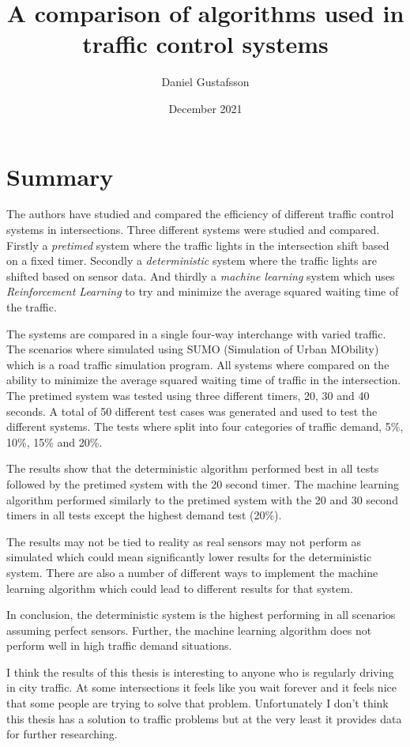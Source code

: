 \documentclass[10pt, a4paper]{article}
\title{A comparison of algorithms used in traffic control systems}
\author{Daniel Gustafsson}
\date{December 2021}
\begin{document}
\maketitle

\section{Summary}
The authors have studied and compared the efficiency of different traffic control systems in intersections.
Three different systems were studied and compared. Firstly a \textit{pretimed} system where the traffic lights
in the intersection shift based on a fixed timer. Secondly a \textit{deterministic} system where the traffic lights
are shifted based on sensor data. And thirdly a \textit{machine learning} system which uses \textit{Reinforcement Learning}
to try and minimize the average squared waiting time of the traffic.

The systems are compared in a single four-way interchange with varied traffic. The scenarios where simulated using SUMO
(Simulation of Urban MObility) which is a road traffic simulation program. All systems where compared on the ability to
minimize the average squared waiting time of traffic in the intersection. The pretimed system was tested using three different
timers, 20, 30 and 40 seconds. A total of 50 different test cases was generated and used to test the different systems.
The tests where split into four categories of traffic demand, 5\%, 10\%, 15\% and 20\%.

The results show that the deterministic algorithm performed best in all tests followed by the pretimed system with the 20 second
timer. The machine learning algorithm performed similarly to the pretimed system with the 20 and 30 second timers in all tests
except the highest demand test (20\%).

The results may not be tied to reality as real sensors may not perform as simulated which could mean significantly lower results
for the deterministic system. There are also a number of different ways to implement the machine learning algorithm which could
lead to different results for that system.

In conclusion, the deterministic system is the highest performing in all scenarios assuming perfect sensors. Further, the
machine learning algorithm does not perform well in high traffic demand situations. 

I think the results of this thesis is interesting to anyone who is regularly driving in city traffic. At some intersections it feels
like you wait forever and it feels nice that some people are trying to solve that problem. Unfortunately I don't think this thesis
has a solution to traffic problems but at the very least it provides data for further researching.
\end{document}

